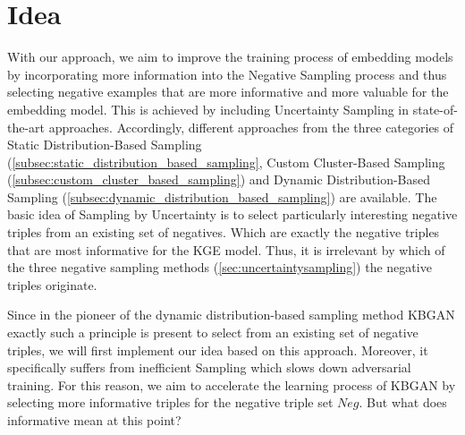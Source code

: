 \section{Idea} 
\label{sec:idea}



With our approach, we aim to improve the training process of embedding models by incorporating more information into the Negative Sampling process and thus selecting negative examples that are more informative and more valuable for the embedding model.
This is achieved by including Uncertainty Sampling in state-of-the-art approaches.
Accordingly, different approaches from the three categories of Static Distribution-Based Sampling (\autoref{subsec:static_distribution_based_sampling}, Custom Cluster-Based Sampling (\autoref{subsec:custom_cluster_based_sampling}) and Dynamic Distribution-Based Sampling (\autoref{subsec:dynamic_distribution_based_sampling}) are available. The basic idea of Sampling by Uncertainty is to select particularly interesting negative triples from an existing set of negatives.
Which are exactly the negative triples that are most informative for the KGE model.
Thus, it is irrelevant by which of the three negative sampling methods (\autoref{sec:uncertaintysampling}) the negative triples originate.

Since in the pioneer of the dynamic distribution-based sampling method KBGAN exactly such a principle is present to select from an existing set of negative triples, we will first implement our idea based on this approach.
Moreover, it specifically suffers from inefficient Sampling which slows down adversarial training.
For this reason, we aim to accelerate the learning process of KBGAN by selecting more informative triples for the negative triple set $Neg$.
But what does informative mean at this point?


